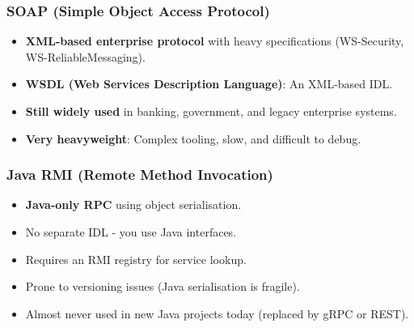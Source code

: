 \documentclass[10pt,a4paper]{article}
\begin{document}
\subsubsection{SOAP (Simple Object Access Protocol)}
\begin{itemize}
    \item \textbf{XML-based enterprise protocol} with heavy specifications (WS-Security, WS-ReliableMessaging).
    \item \textbf{WSDL (Web Services Description Language)}: An XML-based IDL.
    \item \textbf{Still widely used} in banking, government, and legacy enterprise systems.
    \item \textbf{Very heavyweight}: Complex tooling, slow, and difficult to debug.
\end{itemize}

\subsubsection{Java RMI (Remote Method Invocation)}
\begin{itemize}
    \item \textbf{Java-only RPC} using object serialisation.
    \item No separate IDL - you use Java interfaces.
    \item Requires an RMI registry for service lookup.
    \item Prone to versioning issues (Java serialisation is fragile).
    \item Almost never used in new Java projects today (replaced by gRPC or REST).
\end{itemize}
\end{document}
